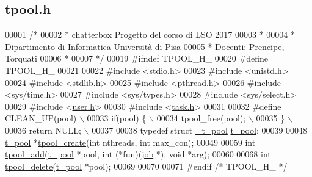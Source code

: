 \hypertarget{tpool_8h_source}{}\subsection{tpool.\+h}

\begin{DoxyCode}
00001 \textcolor{comment}{/*}
00002 \textcolor{comment}{ * chatterbox Progetto del corso di LSO 2017}
00003 \textcolor{comment}{ *}
00004 \textcolor{comment}{ * Dipartimento di Informatica Università di Pisa}
00005 \textcolor{comment}{ * Docenti: Prencipe, Torquati}
00006 \textcolor{comment}{ *}
00007 \textcolor{comment}{ */}
00019 \textcolor{preprocessor}{#ifndef TPOOL\_H\_}
00020 \textcolor{preprocessor}{#define TPOOL\_H\_}
00021 
00022 \textcolor{preprocessor}{#include <stdio.h>}
00023 \textcolor{preprocessor}{#include <unistd.h>}
00024 \textcolor{preprocessor}{#include <stdlib.h>}
00025 \textcolor{preprocessor}{#include <pthread.h>}
00026 \textcolor{preprocessor}{#include <sys/time.h>}
00027 \textcolor{preprocessor}{#include <sys/types.h>}
00028 \textcolor{preprocessor}{#include <sys/select.h>}
00029 \textcolor{preprocessor}{#include <\mbox{\hyperlink{user_8h}{user.h}}>}
00030 \textcolor{preprocessor}{#include <\mbox{\hyperlink{task_8h}{task.h}}>}
00031 
00032 \textcolor{preprocessor}{#define CLEAN\_UP(pool)                                    \(\backslash\)}
00033 \textcolor{preprocessor}{                                if(pool) \{                                \(\backslash\)}
00034 \textcolor{preprocessor}{                                    tpool\_free(pool);                       \(\backslash\)}
00035 \textcolor{preprocessor}{                                \}                                         \(\backslash\)}
00036 \textcolor{preprocessor}{                                return NULL;                              \(\backslash\)}
00037 \textcolor{preprocessor}{}
00038 \textcolor{keyword}{typedef} \textcolor{keyword}{struct }\mbox{\hyperlink{struct__t__pool}{\_t\_pool}} \mbox{\hyperlink{struct__t__pool}{t\_pool}};
00039 
00048 \mbox{\hyperlink{struct__t__pool}{t\_pool}} *\mbox{\hyperlink{tpool_8h_a5e98ff56b31208a0762701f2d97a4fa4}{tpool\_create}}(\textcolor{keywordtype}{int} nthreads, \textcolor{keywordtype}{int} max\_con);
00049 
00059 \textcolor{keywordtype}{int} \mbox{\hyperlink{tpool_8h_a358d0acd03f8339ce5dcc6bc8ff91922}{tpool\_add}}(\mbox{\hyperlink{struct__t__pool}{t\_pool}} *pool, \textcolor{keywordtype}{int} (*fun)(\mbox{\hyperlink{struct__job}{job}} *), \textcolor{keywordtype}{void} *arg);
00060 
00068 \textcolor{keywordtype}{int} \mbox{\hyperlink{tpool_8h_a36eff49591584172a8062630e2edbae5}{tpool\_delete}}(\mbox{\hyperlink{struct__t__pool}{t\_pool}} *pool);
00069 
00070 
00071 \textcolor{preprocessor}{#endif }\textcolor{comment}{/* TPOOL\_H\_ */}\textcolor{preprocessor}{}
\end{DoxyCode}

